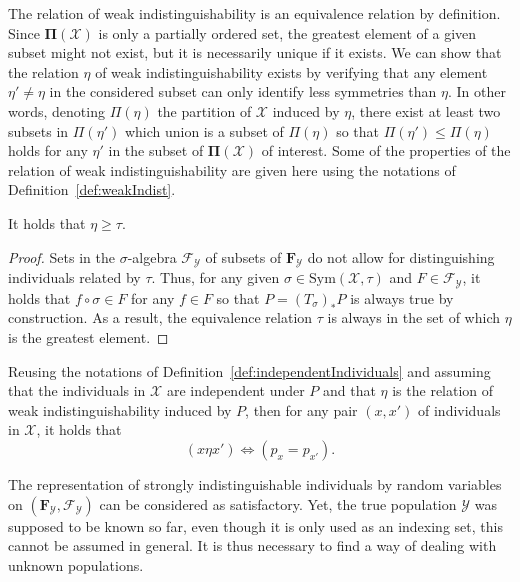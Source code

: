 \documentclass{aptpub}
\numberwithin{equation}{section}
\begin{document}
The relation of weak indistinguishability is an equivalence relation by definition. Since ${\boldsymbol{\Pi}}({\mathcal{X}})$ is only a partially ordered set, the greatest element of a given subset might not exist, but it is necessarily unique if it exists. We can show that the relation $\eta$ of weak indistinguishability exists by verifying that any element $\eta' \neq \eta$ in the considered subset can only identify less symmetries than $\eta$. In other words, denoting $\Pi(\eta)$ the partition of ${\mathcal{X}}$ induced by $\eta$, there exist at least two subsets in $\Pi(\eta')$ which union is a subset of $\Pi(\eta)$ so that $\Pi(\eta') \leq \Pi(\eta)$ holds for any $\eta'$ in the subset of ${\boldsymbol{\Pi}}({\mathcal{X}})$ of interest. Some of the properties of the relation of weak indistinguishability are given here using the notations of Definition~\ref{def:weakIndist}.

\begin{proposition}
It holds that $\eta \geq \tau$.
\end{proposition}

\begin{proof}
Sets in the $\sigma$-algebra ${\mathcal{F}}_{\mathcal{Y}}$ of subsets of ${\mathbf{F}}_{\mathcal{Y}}$ do not allow for distinguishing individuals related by $\tau$. Thus, for any given $\sigma \in {\mathrm{Sym}}({\mathcal{X}},\tau)$ and $F \in {\mathcal{F}}_{\mathcal{Y}}$, it holds that $f \circ \sigma \in F$ for any $f \in F$ so that $P = (T_{\sigma})_*P$ is always true by construction. As a result, the equivalence relation $\tau$ is always in the set of which $\eta$ is the greatest element.
\end{proof}

\begin{example}
Reusing the notations of Definition~\ref{def:independentIndividuals} and assuming that the individuals in ${\mathcal{X}}$ are independent under $P$ and that $\eta$ is the relation of weak indistinguishability induced by $P$, then for any pair $(x,x')$ of individuals in ${\mathcal{X}}$, it holds that
{\begin{equation*}{
(x \eta x') {\Leftrightarrow} (p_x = p_{x'}).
}\end{equation*}}
\end{example}

The representation of strongly indistinguishable individuals by random variables on $({\mathbf{F}}_{\mathcal{Y}}, {\mathcal{F}}_{\mathcal{Y}})$ can be considered as satisfactory. Yet, the true population ${\mathcal{Y}}$ was supposed to be known so far, even though it is only used as an indexing set, this cannot be assumed in general. It is thus necessary to find a way of dealing with unknown populations. 
\end{document}
